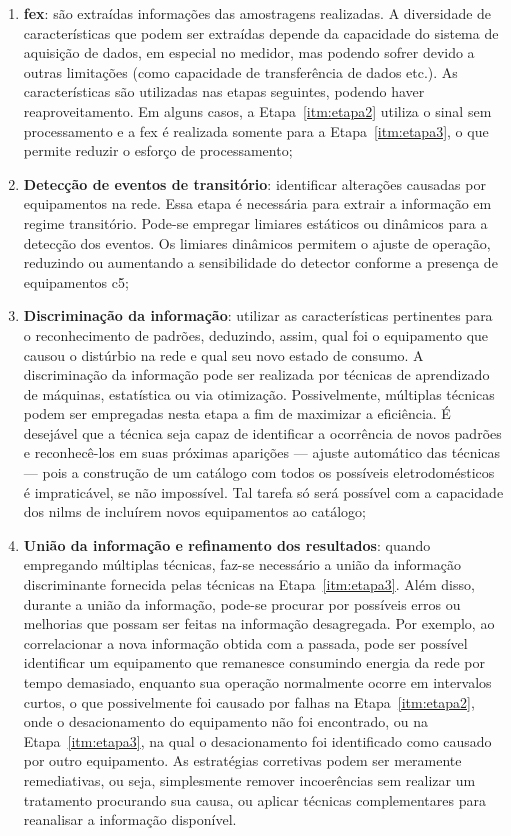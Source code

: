 \begin{enumerate}[label={Etapa} \arabic* - ,ref=\arabic*,align=left]
\item\label{itm:etapa1} \textbf{\gls{fex}}: são extraídas
informações das amostragens realizadas. A diversidade de
características que podem ser extraídas depende da capacidade do
sistema de aquisição de dados, em especial no medidor, mas podendo
sofrer devido a outras limitações (como capacidade de transferência de
dados etc.). As características são utilizadas nas etapas seguintes, podendo
haver reaproveitamento. Em alguns casos, a Etapa~\ref{itm:etapa2}
utiliza o sinal sem processamento e a \gls{fex} é realizada somente
para a Etapa~\ref{itm:etapa3}, o que permite reduzir o esforço de
processamento;
\item\label{itm:etapa2}\textbf{Detecção de eventos de transitório}:
identificar alterações causadas por equipamentos na rede. Essa etapa é
necessária para extrair a informação em regime transitório.
Pode-se empregar limiares estáticos ou dinâmicos para a detecção dos
eventos. Os limiares dinâmicos permitem o ajuste de operação,
reduzindo ou aumentando a sensibilidade do detector conforme a
presença de equipamentos \acs{c5};
\item\label{itm:etapa3}\textbf{Discriminação da informação}: utilizar as
características pertinentes para o reconhecimento de padrões,
deduzindo, assim, qual foi o equipamento que causou o distúrbio na rede
e qual seu novo estado de consumo. A discriminação da informação pode ser
realizada por técnicas de aprendizado de máquinas, estatística ou via
otimização. Possivelmente, múltiplas técnicas podem ser empregadas
nesta etapa a fim de maximizar a eficiência. É desejável que a técnica
seja capaz de identificar a ocorrência de novos padrões e
reconhecê-los em suas próximas aparições --- ajuste automático das
técnicas --- pois a construção de um catálogo com todos os possíveis
eletrodomésticos é impraticável, se não impossível. Tal tarefa só será
possível com a capacidade dos \glspl{nilm} de incluírem novos
equipamentos ao catálogo;
\item\label{itm:etapa4}\textbf{União da informação e refinamento dos
resultados}: quando empregando múltiplas técnicas, faz-se necessário a
união da informação discriminante fornecida pelas técnicas na
Etapa~\ref{itm:etapa3}. Além disso, durante a união da informação,
pode-se procurar por possíveis erros ou melhorias que possam ser
feitas na informação desagregada. Por exemplo, ao correlacionar a nova
informação obtida com a passada, pode ser possível identificar
um equipamento que remanesce consumindo energia da rede por
tempo demasiado, enquanto sua operação normalmente ocorre em
intervalos curtos, o que possivelmente foi causado por falhas na
Etapa~\ref{itm:etapa2}, onde o desacionamento do equipamento não foi
encontrado, ou na Etapa~\ref{itm:etapa3}, na qual o desacionamento foi
identificado como causado por outro equipamento.
As estratégias corretivas podem ser meramente remediativas, ou seja,
simplesmente remover incoerências sem realizar um tratamento
procurando sua causa, ou aplicar técnicas complementares
para reanalisar a informação disponível.
\end{enumerate}

